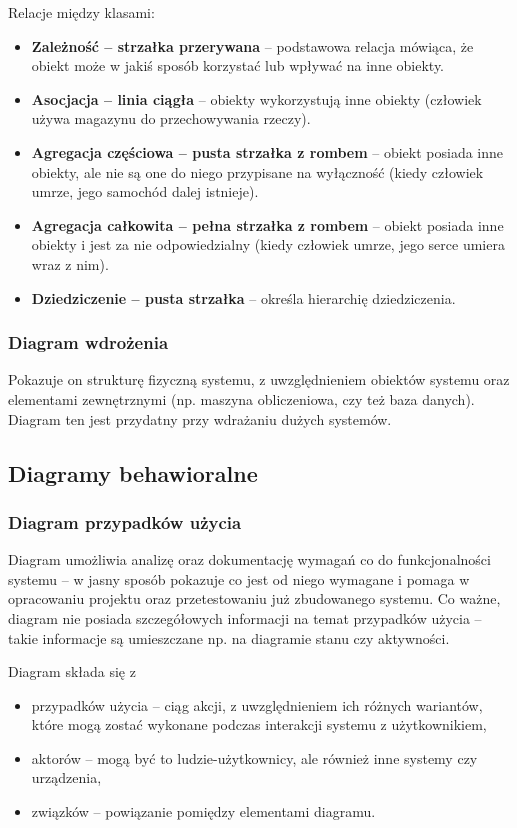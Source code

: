 Relacje między klasami:
\begin{itemize}
	\setlength\itemsep{1pt}
	\item{\textbf{Zależność -- strzałka przerywana} -- podstawowa relacja mówiąca, że obiekt może w jakiś sposób korzystać lub wpływać na inne obiekty.}
	\item{\textbf{Asocjacja -- linia ciągła} -- obiekty wykorzystują inne obiekty (człowiek używa magazynu do przechowywania rzeczy).}
	\item{\textbf{Agregacja częściowa -- pusta strzałka z rombem} -- obiekt posiada inne obiekty, ale nie są one do niego przypisane na wyłączność (kiedy człowiek umrze, jego samochód dalej istnieje).}
	\item{\textbf{Agregacja całkowita -- pełna strzałka z rombem} -- obiekt posiada inne obiekty i jest za nie odpowiedzialny (kiedy człowiek umrze, jego serce umiera wraz z nim).}
	\item{\textbf{Dziedziczenie -- pusta strzałka} -- określa hierarchię dziedziczenia.}
\end{itemize}

\subsubsection{Diagram wdrożenia}
Pokazuje on strukturę fizyczną systemu, z uwzględnieniem obiektów systemu oraz elementami zewnętrznymi (np. maszyna obliczeniowa, czy też baza danych). Diagram ten jest przydatny przy wdrażaniu dużych systemów.

\subsection{Diagramy behawioralne}
\subsubsection{Diagram przypadków użycia}
Diagram umożliwia analizę oraz dokumentację wymagań co do funkcjonalności systemu -- w jasny sposób pokazuje co jest od niego wymagane i pomaga w opracowaniu projektu oraz przetestowaniu już zbudowanego systemu. Co ważne, diagram nie posiada szczegółowych informacji na temat przypadków użycia -- takie informacje są umieszczane np. na diagramie stanu czy aktywności.

Diagram składa się z
\begin{itemize}
	\setlength\itemsep{1pt}
	\item{przypadków użycia -- ciąg akcji, z uwzględnieniem ich różnych wariantów, które mogą zostać wykonane podczas interakcji systemu z użytkownikiem,}
	\item{aktorów -- mogą być to ludzie-użytkownicy, ale również inne systemy czy urządzenia,}
	\item{związków -- powiązanie pomiędzy elementami diagramu.}
\end{itemize}
